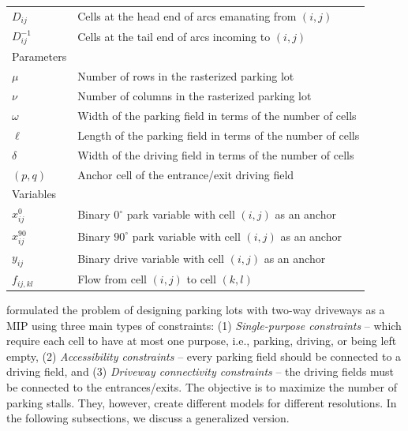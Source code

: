 \documentclass[10pt]{article}
\newcommand{\zeroparkvar}[2]{x^{0}_{#1#2}}
\newcommand{\ninetyparkvar}[2]{x^{90}_{#1#2}}
\newcommand{\drivevar}[2]{y_{#1#2}}
\newcommand{\flowvar}[4]{f_{#1#2,#3#4}}
\newcommand{\gridadjset}[2]{D_{#1#2}}
\newcommand{\gridinvadjset}[2]{D^{-1}_{#1#2}}
\newcommand{\numrows}{\mu}
\newcommand{\numcols}{\nu}
\newcommand{\parkwidth}{\omega}
\newcommand{\parklength}{\ell}
\newcommand{\drivewidth}{\delta}
\newcommand{\entrancex}{p}
\newcommand{\entrancey}{q}
\theoremstyle{definition}
\begin{document}
\begin{longtable}{ll}
    $\gridadjset{i}{j}$ & Cells at the head end of arcs emanating from $(i,j)$\\
    $\gridinvadjset{i}{j}$ & Cells at the tail end of arcs incoming to $(i,j)$\\
    \hline
    Parameters & \\
    \hline
    $\numrows$ & Number of rows in the rasterized parking lot\\
    $\numcols$ & Number of columns in the rasterized parking lot\\
    $\parkwidth$ & Width of the parking field in terms of the number of cells\\
    $\parklength$ & Length of the parking field in terms of the number of cells\\
    $\drivewidth$ & Width of the driving field in terms of the number of cells\\
    $(\entrancex, \entrancey)$ & Anchor cell of the entrance/exit driving field\\
    \hline
    Variables & \\
    \hline
    $\zeroparkvar{i}{j}$ & Binary $0^\circ$ park variable with cell $(i,j)$ as an anchor\\
    $\ninetyparkvar{i}{j}$ & Binary $90^\circ$ park variable with cell $(i,j)$ as an anchor\\
    $\drivevar{i}{j}$ & Binary drive variable with cell $(i,j)$ as an anchor \\
    $\flowvar{i}{j}{k}{l}$ & Flow from cell $(i,j)$ to cell $(k,l)$ \\
    \hline
\end{longtable}

\cite{stephan2021layout} formulated the problem of designing parking lots with two-way driveways as a MIP using three main types of constraints: (1) \textit{Single-purpose constraints} -- which require each cell to have at most one purpose, i.e., parking, driving, or being left empty, (2) \textit{Accessibility constraints} -- every parking field should be connected to a driving field, and (3) \textit{Driveway connectivity constraints} -- the driving fields must be connected to the entrances/exits. The objective is to maximize the number of parking stalls. They, however, create different models for different resolutions. In the following subsections, we discuss a generalized version.
\end{document}
